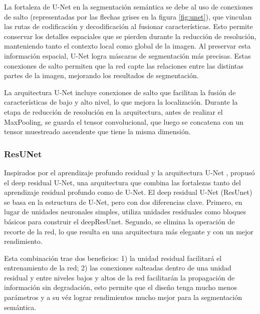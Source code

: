 	La fortaleza de U-Net en la segmentación semántica se debe al uso de conexiones de salto (representadas por las flechas grises en la figura \ref{fig:unet}), que vinculan las rutas de codificación y decodificación al fusionar características. Esto permite conservar los detalles espaciales que se pierden durante la reducción de resolución, manteniendo tanto el contexto local como global de la imagen. Al preservar esta información espacial, U-Net logra máscaras de segmentación más precisas. Estas conexiones de salto permiten que la red capte las relaciones entre las distintas partes de la imagen, mejorando los resultados de segmentación.
	
	La arquitectura U-Net incluye conexiones de salto que facilitan la fusión de características de bajo y alto nivel, lo que mejora la localización. Durante la etapa de reducción de resolución en la arquitectura, antes de realizar el MaxPooling, se guarda el tensor convolucional, que luego se concatena con un tensor muestreado ascendente que tiene la misma dimensión.
	
	\subsubsection{ResUNet}
	
	Inspirados por el aprendizaje profundo residual \parencite{he2016deep} y la arquitectura U-Net \parencite{ronneberger2015u}, \parencite{zhang2018road} propusó el deep residual U-Net, una arquitectura que combina las fortalezas tanto del aprendizaje residual profundo como de U-Net. El deep residual U-Net (ResUnet) se basa en la estructura de U-Net, pero con dos diferencias clave. Primero, en lugar de unidades neuronales simples, utiliza unidades residuales como bloques básicos para construir el deepResUnet. Segundo, se elimina la operación de recorte de la red, lo que resulta en una arquitectura más elegante y con un mejor rendimiento.
	
	Esta combinación trae dos beneficios:
	1) la unidad residual facilitará el entrenamiento de la red; 2) las conexiones salteadas dentro de una unidad residual y entre niveles bajos y altos de la red facilitarán la propagación de información sin degradación, esto permite que el diseño tenga mucho menos parámetros y a su véz lograr rendimientos mucho mejor para la segmentación semántica.


